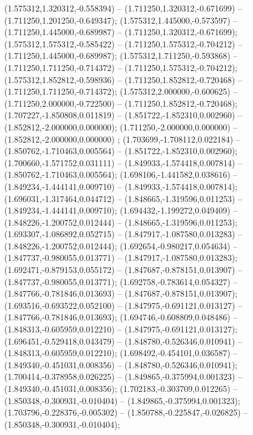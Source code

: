  (1.575312,1.320312,-0.558394) -- (1.711250,1.320312,-0.671699) -- (1.711250,1.201250,-0.649347);
 (1.575312,1.445000,-0.573597) -- (1.711250,1.445000,-0.689987) -- (1.711250,1.320312,-0.671699);
 (1.575312,1.575312,-0.585422) -- (1.711250,1.575312,-0.704212) -- (1.711250,1.445000,-0.689987);
 (1.575312,1.711250,-0.593868) -- (1.711250,1.711250,-0.714372) -- (1.711250,1.575312,-0.704212);
 (1.575312,1.852812,-0.598936) -- (1.711250,1.852812,-0.720468) -- (1.711250,1.711250,-0.714372);
 (1.575312,2.000000,-0.600625) -- (1.711250,2.000000,-0.722500) -- (1.711250,1.852812,-0.720468);
 (1.707227,-1.850808,0.011819) -- (1.851722,-1.852310,0.002960) -- (1.852812,-2.000000,0.000000);
 (1.711250,-2.000000,0.000000) -- (1.852812,-2.000000,0.000000) ;
 (1.703699,-1.708112,0.022184) -- (1.850762,-1.710463,0.005564) -- (1.851722,-1.852310,0.002960);
 (1.700660,-1.571752,0.031111) -- (1.849933,-1.574418,0.007814) -- (1.850762,-1.710463,0.005564);
 (1.698106,-1.441582,0.038616) -- (1.849234,-1.444141,0.009710) -- (1.849933,-1.574418,0.007814);
 (1.696031,-1.317464,0.044712) -- (1.848665,-1.319596,0.011253) -- (1.849234,-1.444141,0.009710);
 (1.694432,-1.199272,0.049409) -- (1.848226,-1.200752,0.012444) -- (1.848665,-1.319596,0.011253);
 (1.693307,-1.086892,0.052715) -- (1.847917,-1.087580,0.013283) -- (1.848226,-1.200752,0.012444);
 (1.692654,-0.980217,0.054634) -- (1.847737,-0.980055,0.013771) -- (1.847917,-1.087580,0.013283);
 (1.692471,-0.879153,0.055172) -- (1.847687,-0.878151,0.013907) -- (1.847737,-0.980055,0.013771);
 (1.692758,-0.783614,0.054327) -- (1.847766,-0.781846,0.013693) -- (1.847687,-0.878151,0.013907);
 (1.693516,-0.693522,0.052100) -- (1.847975,-0.691121,0.013127) -- (1.847766,-0.781846,0.013693);
 (1.694746,-0.608809,0.048486) -- (1.848313,-0.605959,0.012210) -- (1.847975,-0.691121,0.013127);
 (1.696451,-0.529418,0.043479) -- (1.848780,-0.526346,0.010941) -- (1.848313,-0.605959,0.012210);
 (1.698492,-0.454101,0.036587) -- (1.849340,-0.451031,0.008356) -- (1.848780,-0.526346,0.010941);
 (1.700414,-0.378958,0.026225) -- (1.849865,-0.375994,0.001323) -- (1.849340,-0.451031,0.008356);
 (1.702183,-0.303709,0.012265) -- (1.850348,-0.300931,-0.010404) -- (1.849865,-0.375994,0.001323);
 (1.703796,-0.228376,-0.005302) -- (1.850788,-0.225847,-0.026825) -- (1.850348,-0.300931,-0.010404);

